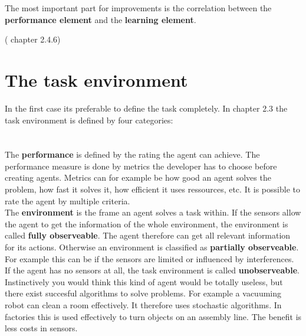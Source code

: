 \documentclass[10pt,a4paper,DIV=11]{scrreprt}
\begin{document}
The most important part for improvements is the correlation between the \textbf{performance element} and the \textbf{learning element}.

(\cite{ai} chapter 2.4.6)

\section{The task environment}
\label{sec:env}
In the first case its preferable to define the task completely. In \cite{ai} chapter 2.3 the task environment is defined by four categories: \\

   \\
\\

The \textbf{performance} is defined by the rating the agent can achieve. The performance measure is done by metrics the developer has to choose before creating agents. Metrics can for example be how good an agent solves the problem, how fast it solves it, how efficient it uses ressources, etc. It is possible to rate the agent by multiple criteria. \\

The \textbf{environment} is the frame an agent solves a task within.
If the sensors allow the agent to get the information of the whole environment, the environment is called \textbf{fully observeable}. The agent therefore can get all relevant information for its actions. Otherwise an environment is classified as \textbf{partially observeable}. For example this can be if the sensors are limited or influenced by interferences.
If the agent has no sensors at all, the task environment is called \textbf{unobserveable}. Instinctively you would think this kind of agent would be totally useless, but there exist succesful algorithms to solve problems. For example a vacuuming robot can clean a room effectively. It therefore uses stochastic algorithms. In factories this is used effectively to turn objects on an assembly line. The benefit is less costs in sensors. \\
\end{document}
